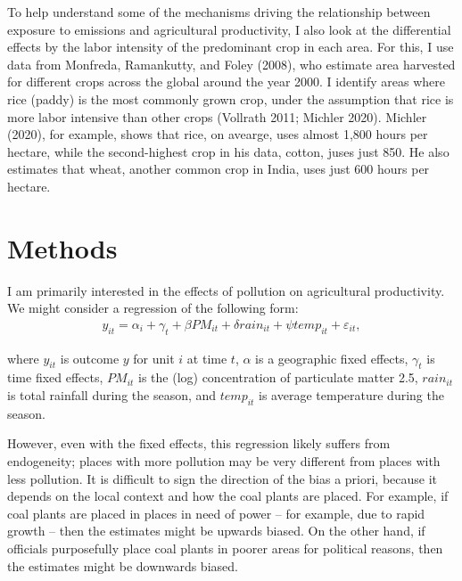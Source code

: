 \documentclass[
]{article}
\begin{document}
To help understand some of the mechanisms driving the relationship between exposure to emissions and agricultural productivity, I also look at the differential effects by the labor intensity of the predominant crop in each area. For this, I use data from Monfreda, Ramankutty, and Foley (2008), who estimate area harvested for different crops across the global around the year 2000. I identify areas where rice (paddy) is the most commonly grown crop, under the assumption that rice is more labor intensive than other crops (Vollrath 2011; Michler 2020). Michler (2020), for example, shows that rice, on avearge, uses almost 1,800 hours per hectare, while the second-highest crop in his data, cotton, juses just 850. He also estimates that wheat, another common crop in India, uses just 600 hours per hectare.

\hypertarget{methods}{%
\section{Methods}\label{methods}}

\label{identification}

I am primarily interested in the effects of pollution on agricultural productivity. We might consider a regression of the following form:
\begin{gather} y_{it} = \alpha_{i} + \gamma_{t} + \beta PM_{it} + \delta rain_{it} + \psi temp_{it} + \varepsilon_{it}, \end{gather}

where \(y_{it}\) is outcome \(y\) for unit \(i\) at time \(t\), \(\alpha\) is a geographic fixed effects, \(\gamma_t\) is time fixed effects, \(PM_{it}\) is the (log) concentration of particulate matter 2.5, \(rain_{it}\) is total rainfall during the season, and \(temp_{it}\) is average temperature during the season.

However, even with the fixed effects, this regression likely suffers from endogeneity; places with more pollution may be very different from places with less pollution. It is difficult to sign the direction of the bias a priori, because it depends on the local context and how the coal plants are placed. For example, if coal plants are placed in places in need of power -- for example, due to rapid growth -- then the estimates might be upwards biased. On the other hand, if officials purposefully place coal plants in poorer areas for political reasons, then the estimates might be downwards biased.
\end{document}
